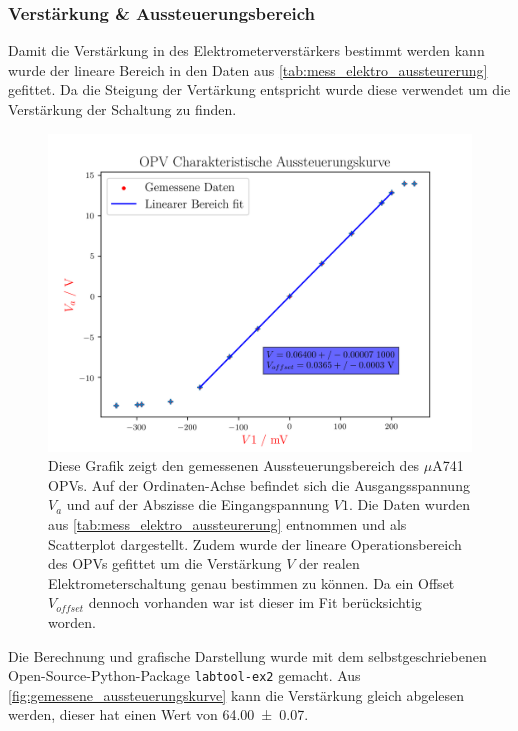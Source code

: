 \documentclass[12pt,english,ngerman]{scrartcl}
\begin{document}
\subsubsection{Verstärkung \& Aussteuerungsbereich}
Damit die Verstärkung in des Elektrometerverstärkers bestimmt werden kann wurde
der lineare Bereich in den Daten aus \autoref{tab:mess_elektro_aussteurerung}
gefittet. Da die Steigung der Vertärkung entspricht wurde diese verwendet  um
die Verstärkung der Schaltung zu finden.

\begin{figure}[H]
  \centering
    \includegraphics[width=\linewidth]{./Output/OPV/opvmessung.png}
    \caption{Diese Grafik zeigt den gemessenen Aussteuerungsbereich des
    $\mu$A741 OPVs. Auf der Ordinaten-Achse befindet sich die Ausgangsspannung
    $V_a$ und auf der Abszisse die Eingangspannung $V1$. Die Daten wurden aus
    \autoref{tab:mess_elektro_aussteurerung} entnommen und als Scatterplot
    dargestellt. Zudem wurde der lineare Operationsbereich des OPVs gefittet um
  die Verstärkung $V$ der realen Elektrometerschaltung genau bestimmen zu
können. Da ein Offset $V_{offset}$ dennoch vorhanden war ist dieser im Fit
berücksichtig worden.}
  \label{fig:gemessene_aussteuerungskurve}
\end{figure}

Die Berechnung und grafische Darstellung wurde mit dem selbstgeschriebenen
Open-Source-Python-Package \texttt{labtool-ex2}\cite{labtool} gemacht. Aus
\autoref{fig:gemessene_aussteuerungskurve} kann die Verstärkung gleich
abgelesen werden, dieser hat einen Wert von \num{64.00(7)}.
\end{document}
